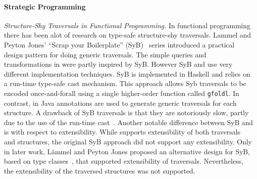 \paragraph{Strategic Programming}



\textit{Structure-Shy Traversals in Functional Programming.}  In
functional programming there has been alot of research on type-safe
structure-shy traversals. Lammel and Peyton Jones' ``Scrap your
Boilerplate'' (SyB)~\cite{ralf03syb,lammel04syb,lammel05syb} series
introduced a practical design pattern for doing generic
traversals. The simple queries and transformations in
\name were partly inspired by SyB. However SyB and \name use very
different implementation techniques. SyB is implemented in Haskell and
relies on a run-time type-safe cast mechanism. This approach allows
Syb traversals to be encoded once-and-forall using a single
higher-order function called \lstinline{gfoldl}. In contrast, in \name
Java annotations are used to generate generic traversals for each
structure. A drawback of SyB traversals is that they are notoriously
slow, partly due to the use of the run-time
cast~\cite{adams2012tyb}. Another notable difference between SyB and
\name is with respect to extensibility. While \name supports
extensibility of both traversals and structures, the original SyB
approach did not support any extensibility. Only in later work,
L\"ammel and Peyton Jones proposed an alternative design for SyB,
based on type classes~\cite{wadler89type-classes}, that supported
extensibility of traversals. Nevertheless, the extensibility of the
traversed structures was not supported.


